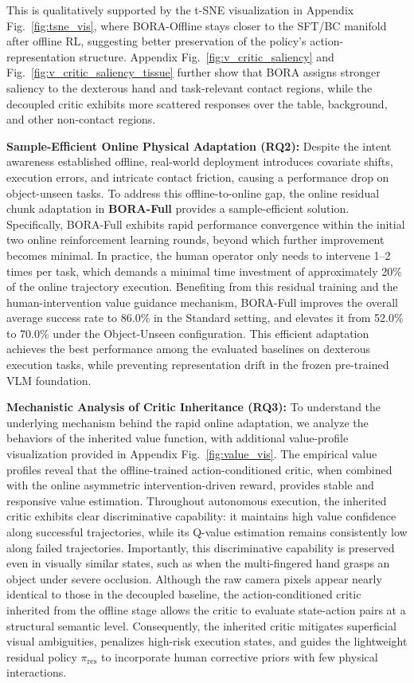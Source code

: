 \documentclass{article}
\begin{document}
This is qualitatively supported by the t-SNE visualization in Appendix Fig.~\ref{fig:tsne_vis}, where BORA-Offline stays closer to the SFT/BC manifold after offline RL, suggesting better preservation of the policy's action-representation structure. Appendix Fig.~\ref{fig:v_critic_saliency} and Fig.~\ref{fig:v_critic_saliency_tissue} further show that BORA assigns stronger saliency to the dexterous hand and task-relevant contact regions, while the decoupled critic exhibits more scattered responses over the table, background, and other non-contact regions.

\textbf{Sample-Efficient Online Physical Adaptation (RQ2):} Despite the intent awareness established offline, real-world deployment introduces covariate shifts, execution errors, and intricate contact friction, causing a performance drop on object-unseen tasks. 
To address this offline-to-online gap, the online residual chunk adaptation in \textbf{BORA-Full} provides a sample-efficient solution. 
Specifically, BORA-Full exhibits rapid performance convergence within the initial two online reinforcement learning rounds, beyond which further improvement becomes minimal. In practice, the human operator only needs to intervene 1–2 times per task, which demands a minimal time investment of approximately 20\% of the online trajectory execution.
Benefiting from this residual training and the human-intervention value guidance mechanism, BORA-Full improves the overall average success rate to 86.0\% in the Standard setting, and elevates it from 52.0\% to 70.0\% under the Object-Unseen configuration. 
This efficient adaptation achieves the best performance among the evaluated baselines on dexterous execution tasks, while preventing representation drift in the frozen pre-trained VLM foundation.


\textbf{Mechanistic Analysis of Critic Inheritance (RQ3):}
To understand the underlying mechanism behind the rapid online adaptation, we analyze the behaviors of the inherited value function, with additional value-profile visualization provided in Appendix Fig.~\ref{fig:value_vis}. 
The empirical value profiles reveal that the offline-trained action-conditioned critic, when combined with the online asymmetric intervention-driven reward, provides stable and responsive value estimation. 
Throughout autonomous execution, the inherited critic exhibits clear discriminative capability: it maintains high value confidence along successful trajectories, while its Q-value estimation remains consistently low along failed trajectories. 
Importantly, this discriminative capability is preserved even in visually similar states, such as when the multi-fingered hand grasps an object under severe occlusion. 
Although the raw camera pixels appear nearly identical to those in the decoupled baseline, the action-conditioned critic inherited from the offline stage allows the critic to evaluate state-action pairs at a structural semantic level. 
Consequently, the inherited critic mitigates superficial visual ambiguities, penalizes high-risk execution states, and guides the lightweight residual policy $\pi_{\mathrm{res}}$ to incorporate human corrective priors with few physical interactions.
\end{document}
